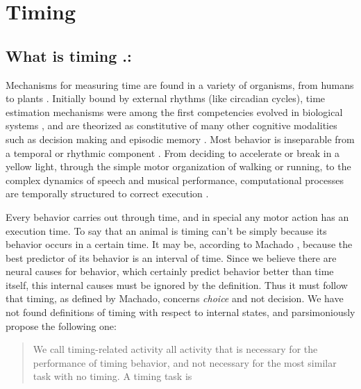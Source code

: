 \chapter{Timing}
\section{What is timing .:}
    Mechanisms for measuring time are found in a variety of organisms, from humans to plants \cite{cashmore2003cryptochromes}. Initially bound by external rhythms (like circadian cycles), time estimation mechanisms were among the first competencies evolved in biological systems \cite{paranjpe2005evolution}, and are theorized as constitutive of many other cognitive modalities such as decision making and episodic memory \cite{maniadakis2014time}. Most behavior is inseparable from a temporal or rhythmic component \cite{buhusi2005makes}. From deciding to accelerate or break in a yellow light, through the simple motor organization of walking or running, to the complex dynamics of speech and musical performance, computational processes are temporally structured to correct execution \cite{bueti2014temporal}. %

    Every behavior carries out through time, and in special any motor action has an execution time. To say that an animal is timing can't be simply because its behavior occurs in a certain time. It may be, according to Machado \cite{machado2009learning}, because the best predictor of its behavior is an interval of time. Since we believe there are neural causes for behavior, which certainly predict behavior better than time itself, this internal causes must be ignored by the definition. Thus it must follow that timing, as defined by Machado, concerns \textit{choice} and not decision. We have not found definitions of timing with respect to internal states, and parsimoniously propose the following one: 
    \begin{quote}
    We call timing-related activity all activity that is necessary for the performance of timing behavior, and not necessary for the most similar task with no timing.
    A timing task is 
    \end{quote}
    
